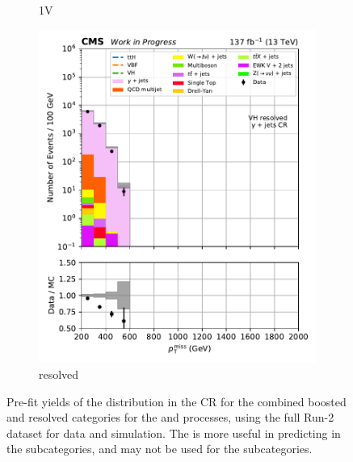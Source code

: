 \begin{figure}[htbp]
\begin{subfigure}[b]{0.24\textwidth}
        \caption{\VH 1V}
    \end{subfigure}
    \hfill
    \begin{subfigure}[b]{0.24\textwidth}
        \includegraphics[width=\textwidth]{figures/region_plots/2016to18/region_5/VH_resolved.pdf}
        \caption{\VH resolved}
    \end{subfigure}
    \caption[Pre-fit yields of the \ptmiss distribution in the \singlePhotonCr control region for the combined boosted and resolved categories for the \ttH and \VH processes, using the full Run-2 dataset for data and simulation]{Pre-fit yields of the \ptmiss distribution in the \singlePhotonCr \gls{CR} for the combined boosted and resolved categories for the \ttH and \VH processes, using the full Run-2 dataset for data and simulation. The \singlePhotonCr is more useful in predicting \ztonunupjets in the \VH subcategories, and may not be used for the \ttH subcategories.}
    \label{fig:htoinv_cr_yields_comb2016to18_single_photon}
\end{figure}



